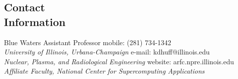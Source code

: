 \documentclass[margin,line]{resume}
\begin{document}
\begin{resume}

    \section{\mysidestyle Contact\\Information}
    Blue Waters Assistant Professor \hfill mobile: (281) 734-1342 \vspace{0mm}\\\vspace{0mm}%
        \textsl{University of Illinois, Urbana-Champaign}
        \hfill e-mail: kdhuff@illinois.edu            \vspace{0mm}\\\vspace{0mm}%
    \textsl{Nuclear, Plasma, and Radiological Engineering}
        \hfill website: arfc.npre.illinois.edu     \vspace{0mm}\\\vspace{-4.5mm}%
    \textsl{Affiliate Faculty, National Center for Supercomputing Applications}           \vspace{0mm}\\\vspace{0mm}%


\end{resume}
\end{document}

